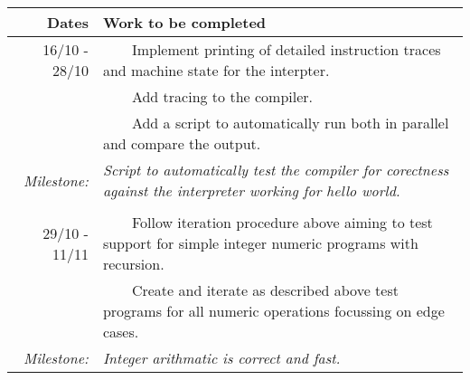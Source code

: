 \documentclass[12pt,a4paper, headings=standardclasses]{scrartcl}
\newcommand{\tabitem}{~~\llap{\textbullet}~~}
\begin{document}
\begin{tabularx}{\textwidth}{rX} \toprule
      Dates & Work to be completed                                                                                                   \\ \midrule
      16/10 - 28/10
            & \tabitem Implement printing of detailed instruction traces and machine state for the interpter.                        \\
            & \tabitem Add tracing to the compiler.                                                                                  \\
            & \tabitem Add a script to automatically run both in parallel and compare the output.                                    \\
      \textit{Milestone:}
            & \textit{Script to automatically test the compiler for corectness against the interpreter working for hello world.}     \\

            &                                                                                                                        \\

      29/10 - 11/11
            & \tabitem Follow iteration procedure above aiming to test support for simple integer numeric programs with recursion.   \\
            & \tabitem Create and iterate as described above test programs for all numeric operations focussing on edge cases.       \\
      \textit{Milestone:}
            & \textit{Integer arithmatic is correct and fast.}                                                                       \\


\end{tabularx}
\end{document}

